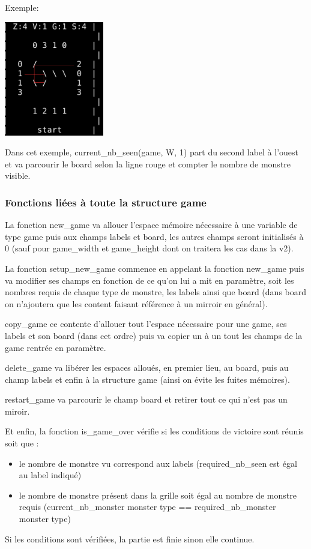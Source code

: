 \documentclass[12]{article}
\begin{document}
Exemple:

\includegraphics[height=5cm]{ex_ligne_de_vue.png}

Dans cet exemple, current\_nb\_seen(game, W, 1) part du second label à l'ouest et va parcourir le board selon la ligne rouge et compter le nombre de monstre visible.
\subsubsection{ Fonctions liées à toute la structure game}
La fonction new\_game va allouer l'espace mémoire nécessaire à une variable de type game puis aux champs labels et board, les autres champs seront initialisés à 0 (sauf pour game\_width et game\_height dont on traitera les cas dans la v2).

La fonction setup\_new\_game commence en appelant la fonction new\_game puis va modifier ses champs en fonction de ce qu'on lui a mit en paramètre, soit les nombres requis de chaque type de monstre, les labels ainsi que board (dans board on n'ajoutera que les content faisant référence à un mirroir en général).

copy\_game ce contente d'allouer tout l'espace nécessaire pour une game, ses labels et son board (dans cet ordre) puis va copier un à un tout les champs de la game rentrée en paramètre.

  delete\_game va libérer les espaces alloués, en premier lieu, au board, puis au champ labels et enfin à la structure game (ainsi on évite les fuites mémoires).

  restart\_game va parcourir le champ board et retirer tout ce qui n'est pas un miroir.

  Et enfin, la fonction is\_game\_over vérifie si les conditions de victoire sont réunis soit que :
  \begin{itemize}
  \item le nombre de monstre vu correspond aux labels (required\_nb\_seen est égal au label indiqué)
  \item le nombre de monstre présent dans la grille soit égal au nombre de monstre requis (current\_nb\_monster monster type == required\_nb\_monster monster type)
  \end{itemize}
  Si les conditions sont vérifiées, la partie est finie sinon elle continue.
\end{document}

